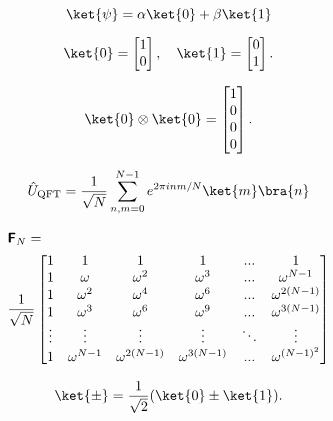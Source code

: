 \begin{equation}

\ket{\psi} = \alpha\ket{0} + \beta\ket{1}
\end{equation}

\begin{equation}

\ket{0} = \begin{bmatrix} 1 \\ 0 \end{bmatrix}, \quad \ket{1} = \begin{bmatrix} 0 \\ 1 \end{bmatrix}.
\end{equation}

\begin{equation}

\ket{0}\otimes\ket{0} = \begin{bmatrix} 1 \\ 0 \\ 0 \\ 0 \end{bmatrix}.
\end{equation}

\begin{equation}

\hat{U}_\textrm{QFT} = \frac{1}{\sqrt{N}} \sum_{n,m=0}^{N-1} e^{2\pi i nm/N} \ket{m}\bra{n}
\end{equation}

\begin{align}

&\textsf{\textbf{F}}_N = \nonumber\\
&\frac{1}{\sqrt{N}} \begin{bmatrix}
1 & 1 & 1 & 1 & ... & 1 \\
1 & \omega & \omega^2 & \omega^3 & ... & \omega^{N-1} \\
1 & \omega^2 & \omega^4 & \omega^6 & ... & \omega^{2(N-1)} \\
1 & \omega^3 & \omega^6 & \omega^9 & ... & \omega^{3(N-1)} \\
\vdots & \vdots & \vdots & \vdots & \ddots & \vdots \\
1 & \omega^{N-1} & \omega^{2(N-1)} & \omega^{3(N-1)} & ... & \omega^{(N-1)^2}
\end{bmatrix} \label{eq:qft-matrix}
\end{align}

\begin{equation}

\ket{\pm} = \frac{1}{\sqrt{2}} (\ket{0} \pm \ket{1}).
\end{equation}

